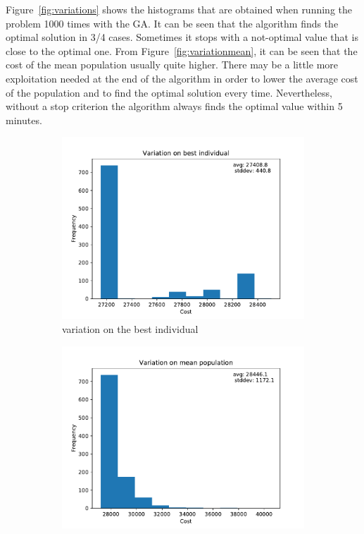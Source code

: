 \documentclass[a4paper,10pt]{article}
\begin{document}
Figure~\ref{fig:variations} shows the histograms that are obtained when running the problem 1000 times with the GA. It can be seen that the algorithm finds the optimal solution in 3/4 cases. Sometimes it stops with a not-optimal value that is close to the optimal one. From Figure~\ref{fig:variationmean}, it can be seen that the cost of the mean population usually quite higher. There may be a little more exploitation needed at the end of the algorithm in order to lower the average cost of the population and to find the optimal solution every time. Nevertheless, without a stop criterion the algorithm always finds the optimal value within 5 minutes.
\begin{figure}[H]
    \begin{subfigure}{0.55\linewidth}
      \centering
      \includegraphics[width=\linewidth]{img/variationbest.pdf}
      \caption{variation on the best individual}
      \label{fig:variationbest}
    \end{subfigure}
    \begin{subfigure}{0.5\linewidth}
      \centering
      \includegraphics[width=\linewidth]{img/variationmean2.pdf}

\end{subfigure}
\end{figure}
\end{document}

